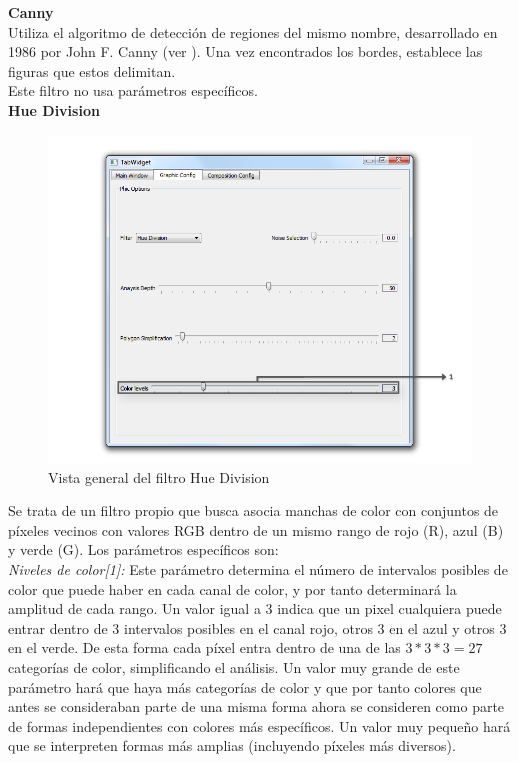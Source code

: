 	\noindent\textbf{Canny}\\

		Utiliza el algoritmo de detección de regiones del mismo nombre, desarrollado en 1986 por John F. Canny (ver \cite{opencvDoc}). Una vez encontrados los bordes, establece las figuras que estos delimitan.\\
		
		Este filtro no usa parámetros específicos.\\
		
	\noindent\textbf{Hue Division}\\

		\begin{figure}[htbp]
		\centering
		\hspace*{-0.9in}
		\includegraphics[scale=0.57]{graphics/interfazhue.png}
		\caption{Vista general del filtro Hue Division}
		\label{fig:interfazhue}
		\end{figure}

		Se trata de un filtro propio que busca asocia manchas de color con conjuntos de píxeles vecinos con valores RGB dentro de un mismo rango de rojo (R), azul (B) y verde (G). Los parámetros específicos son:\\
		
		\noindent\textit{Niveles de color[1]:} Este parámetro determina el número de intervalos posibles de color que puede haber en cada canal de color, y por tanto determinará la amplitud de cada rango. Un valor igual a 3 indica que un pixel cualquiera puede entrar dentro de 3 intervalos posibles en el canal rojo, otros 3 en el azul y otros 3 en el verde. De esta forma cada píxel entra dentro de una de las $3*3*3=27$ categorías de color, simplificando el análisis. Un valor muy grande de este parámetro hará que haya más categorías de color y que por tanto colores que antes se consideraban parte de una misma forma ahora se consideren como parte de formas independientes con colores más específicos. Un valor muy pequeño hará que se interpreten formas más amplias (incluyendo píxeles más diversos).\\
		
